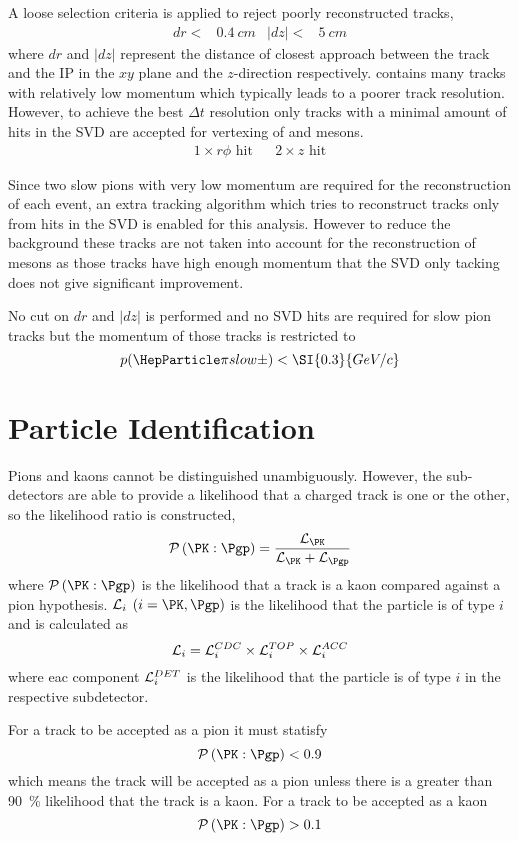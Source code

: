 \documentclass[a4paper]{report}
\begin{document}
A loose selection criteria is applied to reject poorly reconstructed tracks,
\begin{align*}
    dr <& \SI{0.4}{cm}& |dz| <&\SI{5}{cm}
\end{align*}
where $dr$ and $|dz|$ represent the distance of closest approach between the
track and the IP in the $xy$ plane and the $z$-direction respectively. \ddk
contains many tracks with relatively low momentum which typically leads to a
poorer track resolution. However, to achieve the best $\Delta t$ resolution only
tracks with a minimal amount of hits in the SVD are accepted for vertexing of
\PD and \PBz mesons.
\begin{align*}
    1\times r\phi \text{ hit}&& 2\times z \text{ hit}
\end{align*}

Since two slow pions with very low momentum are required for the reconstruction
of each event, an extra tracking algorithm which tries to reconstruct tracks
only from hits in the SVD is enabled for this analysis. However to reduce the
background these tracks are not taken into account for the reconstruction of
\PD mesons as those tracks have high enough momentum that the SVD only tacking
does not give significant improvement.

No cut on $dr$ and $|dz|$ is performed and no SVD hits are required for slow
pion tracks but the momentum of those tracks is restricted to
\[ p(\Pgppms) < \SI{0.3}{GeV/c} \]

\section{Particle Identification}

Pions and kaons cannot be distinguished unambiguously. However, the
sub-detectors are able to provide a likelihood that a charged track is one or
the other, so the likelihood ratio is constructed,
\[
\mathcal{P}\left( \PK : \Pgp \right) =
\frac{\LH_{\PK}}{\LH_{\PK} +
\LH_{\Pgp}}
\]
where $\mathcal{P}\left( \PK : \Pgp \right)$ is the likelihood that a track is a
kaon compared against a pion hypothesis. $\mathcal{L}_i$ $(i = \PK, \Pgp)$ is
the likelihood that the particle is of type $i$ and is calculated as
\[ \mathcal{L}_i = \mathcal{L}_i^{CDC} \times \mathcal{L}_i^{TOP} \times \mathcal{L}_i^{ACC} \]
where eac component $\mathcal{L}_i^{DET}$ is the likelihood that the particle is of type
$i$ in the respective subdetector.


For a track to be accepted as a pion it must statisfy
\[ \mathcal{P}\left( \PK : \Pgp \right) < 0.9 \]
which means the track will be accepted as a pion unless there is a greater than
\SI{90}{\%} likelihood that the track is a kaon. For a track to be accepted as a
kaon
\[ \mathcal{P}\left( \PK : \Pgp \right) > 0.1 \]
\end{document}
